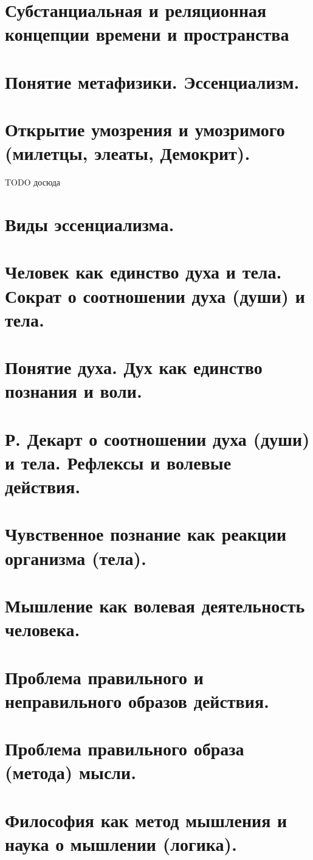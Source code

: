 \section{ Субстанциальная и реляционная концепции времени и пространства}
\section{ Понятие метафизики. Эссенциализм.}
\section{ Открытие умозрения и умозримого (милетцы, элеаты, Демокрит).}

TODO досюда

\section{ Виды эссенциализма.}
\section{ Человек как единство духа и тела. Сократ о соотношении духа (души) и тела.}
\section{ Понятие духа. Дух как единство познания и воли.}
\section{ Р. Декарт о соотношении духа (души) и тела. Рефлексы и волевые действия.}
\section{ Чувственное познание как реакции организма (тела).}
\section{ Мышление как волевая деятельность человека.}
\section{ Проблема правильного и неправильного образов действия.}
\section{ Проблема правильного образа (метода) мысли.}
\section{ Философия как метод мышления и наука о мышлении (логика).}
